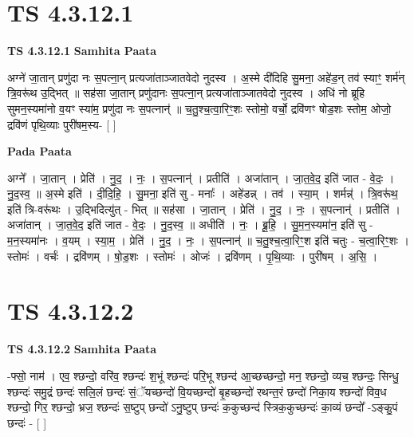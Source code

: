 \documentclass[17pt]{extarticle}
\begin{document}
\section*{ TS 4.3.12.1 }

\textbf{TS 4.3.12.1 } \newline
\textbf{Samhita Paata} \newline

अग्ने॑ जा॒तान् प्रणु॑दा नः स॒पत्ना॒न् प्रत्यजा॑ताञ्जातवेदो नुदस्व । अ॒स्मे दी॑दिहि सु॒मना॒ अहे॑ड॒न् तव॑ स्याꣳ॒॒ शर्म॑न् त्रि॒वरू॑थ उ॒द्भित् ॥ सह॑सा जा॒तान् प्रणु॑दानः स॒पत्ना॒न् प्रत्यजा॑ताञ्जातवेदो नुदस्व । अधि॑ नो ब्रूहि सुमन॒स्यमा॑नो व॒यꣳ स्या॑म॒ प्रणु॑दा नः स॒पत्नान्॑ ॥ च॒तु॒श्च॒त्वा॒रिꣳ॒॒शः स्तोमो॒ वर्चो॒ द्रवि॑णꣳ षोड॒शः स्तोम॒ ओजो॒ द्रवि॑णं पृथि॒व्याः पुरी॑षम॒स्य- [  ] \newline

\textbf{Pada Paata} \newline

अग्ने᳚ । जा॒तान् । प्रेति॑ । नु॒द॒ । नः॒ । स॒पत्नान्॑ । प्रतीति॑ । अजा॑तान् । जा॒त॒वे॒द॒ इति॑ जात - वे॒दः॒ । नु॒द॒स्व॒ ॥ अ॒स्मे इति॑ । दी॒दि॒हि॒ । सु॒मना॒ इति॑ सु - मनाः᳚ । अहे॑डन्न् । तव॑ । स्या॒म् । शर्मन्न्॑ । त्रि॒वरू॑थ॒ इति॑ त्रि-वरू॑थः । उ॒द्भिदित्यु॑त् - भित् ॥ सह॑सा । जा॒तान् । प्रेति॑ । नु॒द॒ । नः॒ । स॒पत्नान्॑ । प्रतीति॑ । अजा॑तान् । जा॒त॒वे॒द॒ इति॑ जात - वे॒दः॒ । नु॒द॒स्व॒ ॥ अधीति॑ । नः॒ । ब्रू॒हि॒ । सु॒म॒न॒स्यमा॑न॒ इति॑ सु - म॒न॒स्यमा॑नः । व॒यम् । स्या॒म॒ । प्रेति॑ । नु॒द॒ । नः॒ । स॒पत्नान्॑ ॥ च॒तु॒श्च॒त्वा॒रिꣳ॒॒श इति॑ चतुः - च॒त्वा॒रिꣳ॒॒शः । स्तोमः॑ । वर्चः॑ । द्रवि॑णम् । षो॒ड॒शः । स्तोमः॑ । ओजः॑ । द्रवि॑णम् । पृ॒थि॒व्याः । पुरी॑षम् । अ॒सि॒ ।  \newline




\section*{ TS 4.3.12.2 }

\textbf{TS 4.3.12.2 } \newline
\textbf{Samhita Paata} \newline

-फ्सो॒ नाम॑ । एव॒ श्छन्दो॒ वरि॑व॒ श्छन्दः॑ श॒भूं श्छन्दः॑ परि॒भू श्छन्द॑ आ॒च्छच्छन्दो॒ मन॒ श्छन्दो॒ व्यच॒ श्छन्दः॒ सिन्धु॒ श्छन्दः॑ समु॒द्रं छन्दः॑ सलि॒लं छन्दः॑ सं॒ॅयच्छन्दो॑ वि॒यच्छन्दो॑ बृ॒हच्छन्दो॑ रथन्त॒रं छन्दो॑ निका॒य श्छन्दो॑ विव॒ध श्छन्दो॒ गिर॒ श्छन्दो॒ भ्रज॒ श्छन्दः॑ स॒ष्टुप् छन्दो॑ ऽनु॒ष्टुप् छन्दः॑ क॒कुच्छन्द॑ स्त्रिक॒कुच्छन्दः॑ का॒व्यं छन्दो᳚ -ऽङ्कु॒पं छन्दः॑ - [  ] \newline
\end{document}
